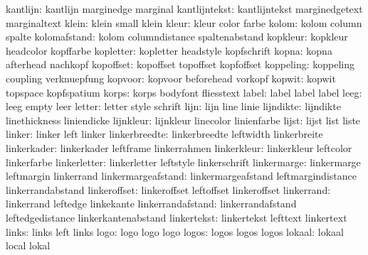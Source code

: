            kantlijn:  kantlijn             marginedge          marginal
      kantlijntekst:  kantlijntekst        marginedgetext      marginaltext
              klein:  klein                small               klein
              kleur:  kleur                color               farbe
              kolom:  kolom                column              spalte
       kolomafstand:  kolom                columndistance      spaltenabstand
           kopkleur:  kopkleur             headcolor           kopffarbe
          kopletter:  kopletter            headstyle           kopfschrift
              kopna:  kopna                afterhead           nachkopf
          kopoffset:  kopoffset            topoffset           kopfoffset
          koppeling:  koppeling            coupling            verknuepfung
            kopvoor:  kopvoor              beforehead          vorkopf
             kopwit:  kopwit               topspace            kopfspatium
              korps:  korps                bodyfont            fliesstext
              label:  label                label               label
               leeg:  leeg                 empty               leer
             letter:  letter               style               schrift
               lijn:  lijn                 line                linie
          lijndikte:  lijndikte            linethickness       liniendicke
          lijnkleur:  lijnkleur            linecolor           linienfarbe
              lijst:  lijst                list                liste
             linker:  linker               left                linker
      linkerbreedte:  linkerbreedte        leftwidth           linkerbreite
        linkerkader:  linkerkader          leftframe           linkerrahmen
        linkerkleur:  linkerkleur          leftcolor           linkerfarbe
       linkerletter:  linkerletter         leftstyle           linkerschrift
        linkermarge:  linkermarge          leftmargin          linkerrand
 linkermargeafstand:  linkermargeafstand   leftmargindistance  linkerrandabstand
       linkeroffset:  linkeroffset         leftoffset          linkeroffset
         linkerrand:  linkerrand           leftedge            linkekante
  linkerrandafstand:  linkerrandafstand    leftedgedistance    linkerkantenabstand
        linkertekst:  linkertekst          lefttext            linkertext
              links:  links                left                links
               logo:  logo                 logo                logo
              logos:  logos                logos               logos
             lokaal:  lokaal               local               lokal
